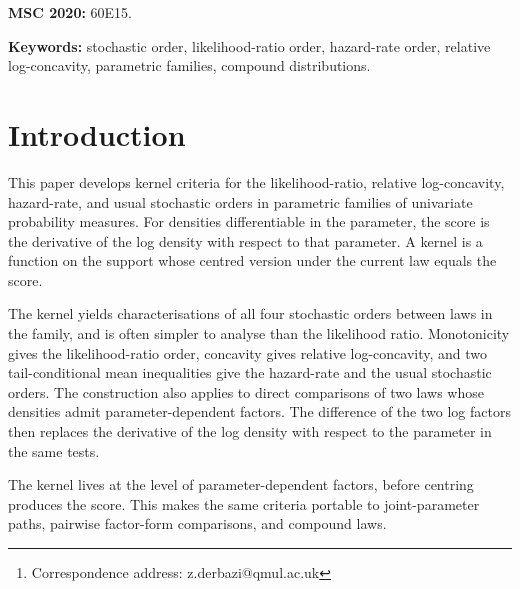 \documentclass[11pt]{article}
\title{\mytitle}
\author{Zakaria Derbazi\footnote{Correspondence address: z.derbazi@qmul.ac.uk}\\{\itshape\small Queen Mary University of London}}
\date{\today}
\def\myabstract{
We develop kernel criteria for the likelihood-ratio, hazard-rate, usual stochastic, and relative log-concavity orders in parametric families of univariate probability laws with densities. The score is the derivative of the log density with respect to the parameter, and a kernel equals the score up to an additive term depending only on the parameter. Kernel monotonicity gives likelihood-ratio order, kernel concavity gives relative log-concavity, and two tail-conditional mean inequalities give the hazard-rate and usual stochastic orders. The same construction applies along joint-parameter paths and to comparisons between two laws whose densities admit parameter-dependent factors, where the log-factor ratio is used as the kernel. For compound sums with a random number of i.i.d. terms, the induced kernel is the posterior mean of the kernel of the summand count. The applications recover standard one-parameter orderings, give likelihood-ratio comparisons for compound laws, and handle nonmonotone examples through the tail-conditional criteria.
}
\begin{document}
\maketitle

\begin{abstract}
\myabstract
\end{abstract}

\medskip\noindent
\textbf{MSC 2020:} 60E15.

\medskip\noindent
\textbf{Keywords:} stochastic order, likelihood-ratio order, hazard-rate order, relative log-concavity, parametric families, compound distributions.


\bigskip
\section{Introduction}
\label{sec:introduction}

This paper develops kernel criteria for the likelihood-ratio, relative log-concavity, hazard-rate, and usual stochastic orders in parametric families of univariate probability measures. For densities differentiable in the parameter, the score is the derivative of the log density with respect to that parameter. A kernel is a function on the support whose centred version under the current law equals the score. %

The kernel yields characterisations of all four stochastic orders between laws in the family, and is often simpler to analyse than the likelihood ratio. Monotonicity gives the likelihood-ratio order, concavity gives relative log-concavity, and two tail-conditional mean inequalities give the hazard-rate and the usual stochastic orders. The construction also applies to direct comparisons of two laws whose densities admit parameter-dependent factors. The difference of the two log factors then replaces the derivative of the log density with respect to the parameter in the same tests.

The kernel lives at the level of parameter-dependent factors, before centring produces the score. This makes the same criteria portable to joint-parameter paths, pairwise factor-form comparisons, and compound laws.
\end{document}
